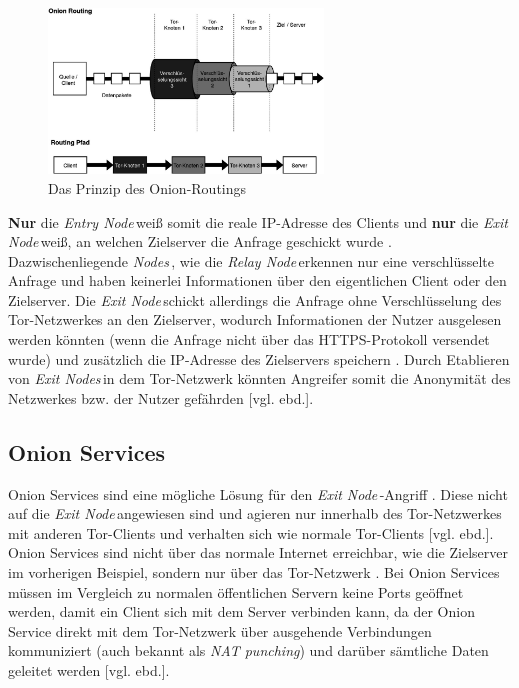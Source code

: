 \documentclass[a4paper,ngerman, headheight=28pt,12pt]{scrartcl}
\newcommand{\vcite}[1]{\cite[vgl.][]{#1}}
\newcommand{\vebd}{[vgl. ebd.]}
\newcommand{\entryn}{\textit{Entry Node\,}}
\newcommand{\relayn}{\textit{Relay Node\,}}
\newcommand{\exitn}{\textit{Exit Node\,}}
\newcommand{\exitns}{\textit{Exit Nodes\,}}
\newcommand{\nodes}{\textit{Nodes\,}}
\begin{document}
\begin{figure}[h]
  \centering
  \includegraphics[width=0.65\textwidth]{TorRoutingSimple.png}
  \caption{Das Prinzip des Onion-Routings \vcite{fig:Tor-Structure} \label{fig:TorStructure}}
\end{figure}

\textbf{Nur} die \entryn weiß somit die reale IP-Adresse des Clients und \textbf{nur} die \exitn weiß, an welchen Zielserver die Anfrage geschickt wurde \vcite{TorStructure2}. Dazwischenliegende \nodes, wie die \relayn erkennen nur eine verschlüsselte Anfrage und haben keinerlei Informationen über den eigentlichen Client oder den Zielserver. Die \exitn schickt allerdings die Anfrage ohne Verschlüsselung des Tor-Netzwerkes an den Zielserver, wodurch Informationen der Nutzer ausgelesen werden könnten (wenn die Anfrage nicht über das HTTPS-Protokoll versendet wurde) und zusätzlich die IP-Adresse des Zielservers speichern \vcite{TorExitNodeVulnerability}. Durch Etablieren von \exitns in dem Tor-Netzwerk könnten Angreifer somit die Anonymität des Netzwerkes bzw. der Nutzer gefährden \vebd.

\subsection{Onion Services}
Onion Services sind eine mögliche Lösung für den \exitn-Angriff \vcite{TorOnionServiceTalk}. Diese nicht auf die \exitn angewiesen sind und agieren nur innerhalb des Tor-Netzwerkes mit anderen Tor-Clients und verhalten sich wie normale Tor-Clients \vebd. Onion Services sind nicht über das normale Internet erreichbar, wie die Zielserver im vorherigen Beispiel, sondern nur über das Tor-Netzwerk \vcite{TorOnionService}. Bei Onion Services müssen im Vergleich zu normalen öffentlichen Servern keine Ports geöffnet werden, damit ein Client sich mit dem Server verbinden kann, da der Onion Service direkt mit dem Tor-Netzwerk über ausgehende Verbindungen kommuniziert (auch bekannt als \textit{NAT punching}) und darüber sämtliche Daten geleitet werden \vebd.
\end{document}
